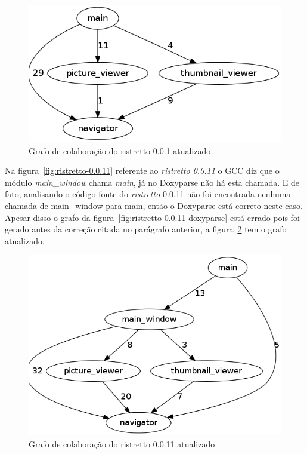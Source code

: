 \begin{figure}[h]
\center
\includegraphics[scale=0.4]{imagens/ristretto-0_0_1-doxyparse-2}
\caption{Grafo de colaboração do ristretto 0.0.1 atualizado}
\label{fig:ristretto-0.0.1-doxyparse-2}
\end{figure}

Na figura~\ref{fig:ristretto-0.0.11} referente ao {\it ristretto 0.0.11} o GCC
diz que o módulo {\it main\_window} chama {\it main}, já no Doxyparse não há
esta chamada. E de fato, analisando o código fonte do {\it ristretto} 0.0.11
não foi encontrada nenhuma chamada de main\_window para main, então o Doxyparse
está correto neste caso. Apesar disso o grafo da
figura~\ref{fig:ristretto-0.0.11-doxyparse} está errado pois foi gerado antes
da correção citada no parágrafo anterior, a
figura~\ref{fig:ristretto-0.0.11-doxyparse-2} tem o grafo atualizado.

\begin{figure}
\center
\includegraphics[scale=0.4]{imagens/ristretto-0_0_11-doxyparse-2}
\caption{Grafo de colaboração do ristretto 0.0.11 atualizado}
\label{fig:ristretto-0.0.11-doxyparse-2}
\end{figure}


